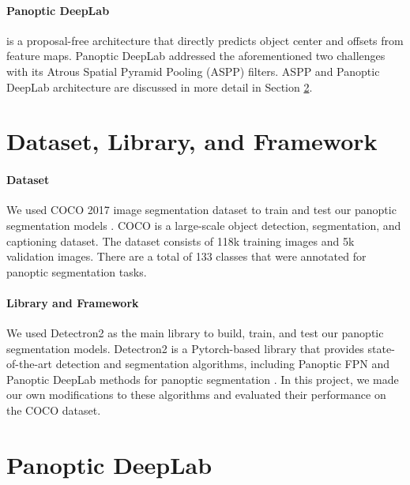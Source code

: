 \documentclass[10pt,twocolumn,letterpaper]{article}
\begin{document}
\paragraph{Panoptic DeepLab} is a proposal-free architecture that directly predicts object center and offsets from feature maps. Panoptic DeepLab addressed the aforementioned two challenges with its Atrous Spatial Pyramid Pooling (ASPP) filters. ASPP and Panoptic DeepLab architecture are discussed in more detail in Section \ref{sec:deeplab}.


\section{Dataset, Library, and Framework}

\paragraph{Dataset} 
We used COCO 2017 image segmentation dataset to train and test our panoptic segmentation models \cite{lin2014microsoft}. COCO is a large-scale object detection, segmentation, and captioning dataset. The dataset consists of 118k training images and 5k validation images. There are a total of 133 classes that were annotated for panoptic segmentation tasks.

\paragraph{Library and Framework}
We used Detectron2 as the main library to build, train, and test our panoptic segmentation models. Detectron2 is a Pytorch-based library that provides state-of-the-art detection and segmentation algorithms, including Panoptic FPN and Panoptic DeepLab methods for panoptic segmentation \cite{wu2019detectron2}. In this project, we made our own modifications to these algorithms and evaluated their performance on the COCO dataset.

\section{Panoptic DeepLab}
\label{sec:deeplab}
\end{document}

